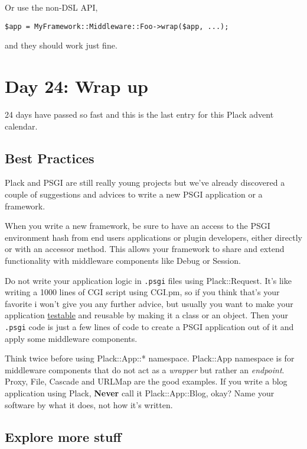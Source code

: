 Or use the non-DSL API,

\begin{lstlisting}
$app = MyFramework::Middleware::Foo->wrap($app, ...);
\end{lstlisting}

and they should work just fine.

\section{Day 24: Wrap up}\label{day-24-wrap-up}

24 days have passed so fast and this is the last entry for this Plack
advent calendar.

\subsection{Best Practices}\label{best-practices}

Plack and PSGI are still really young projects but we've already
discovered a couple of suggestions and advices to write a new PSGI
application or a framework.

When you write a new framework, be sure to have an access to the PSGI
environment hash from end users applications or plugin developers,
either directly or with an accessor method. This allows your framework
to share and extend functionality with middleware components like Debug
or Session.

Do not write your application logic in \lstinline!.psgi! files using
Plack::Request. It's like writing a 1000 lines of CGI script using
CGI.pm, so if you think that's your favorite i won't give you any
further advice, but usually you want to make your application
\href{http://advent.plackperl.org/2009/12/day-13-use-placktest-to-test-your-application.html}{testable}
and reusable by making it a class or an object. Then your
\lstinline!.psgi! code is just a few lines of code to create a PSGI
application out of it and apply some middleware components.

Think twice before using Plack::App::* namespace. Plack::App namespace
is for middleware components that do not act as a \emph{wrapper} but
rather an \emph{endpoint}. Proxy, File, Cascade and URLMap are the good
examples. If you write a blog application using Plack, \textbf{Never}
call it Plack::App::Blog, okay? Name your software by what it does, not
how it's written.

\subsection{Explore more stuff}\label{explore-more-stuff}

